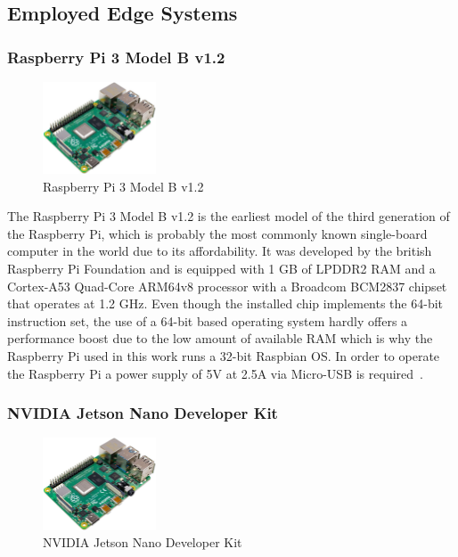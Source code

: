 \subsection{Employed Edge Systems}
\subsubsection{Raspberry Pi 3 Model B v1.2}

\begin{figure}[h]
    \centering
    \includegraphics[width=0.30\textwidth]{./figures/mesh}
    \caption{Raspberry Pi 3 Model B v1.2}
    \label{fig:raspberry-pi}
\end{figure}


The Raspberry Pi 3 Model B v1.2 is the earliest model of the third generation of the Raspberry Pi, which is probably the most commonly known single-board computer in the world due to its affordability. It was developed by the british Raspberry Pi Foundation and is equipped with 1 GB of LPDDR2 RAM and a Cortex-A53 Quad-Core ARM64v8 processor with a Broadcom BCM2837 chipset that operates at 1.2 GHz. Even though the installed chip implements the 64-bit instruction set, the use of a 64-bit based operating system hardly offers a performance boost due to the low amount of available RAM which is why the Raspberry Pi used in this work runs a 32-bit Raspbian OS. In order to operate the Raspberry Pi a power supply of 5V at 2.5A via Micro-USB is required~\parencite{raspberry-pi-intro}.

\subsubsection{NVIDIA Jetson Nano Developer Kit}

\begin{figure}[h]
    \centering
    \includegraphics[width=0.30\textwidth]{./figures/mesh}
    \caption{NVIDIA Jetson Nano Developer Kit}
    \label{fig:jetson-nano}
\end{figure}

